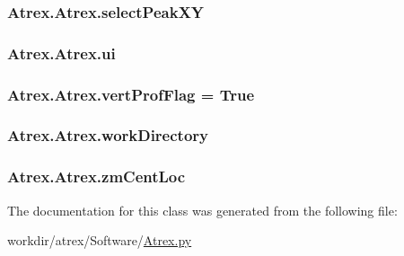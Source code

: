 \hypertarget{class_atrex_1_1_atrex_a9ddce163f1008e4421d95874f8a7e006}{
\subsubsection[{select\-Peak\-X\-Y}]{\setlength{\rightskip}{0pt plus 5cm}Atrex.\-Atrex.\-select\-Peak\-X\-Y}}\label{class_atrex_1_1_atrex_a9ddce163f1008e4421d95874f8a7e006}
\hypertarget{class_atrex_1_1_atrex_a35cabdfa4a6164da07e19c4b4ed957aa}{
\subsubsection[{ui}]{\setlength{\rightskip}{0pt plus 5cm}Atrex.\-Atrex.\-ui}}\label{class_atrex_1_1_atrex_a35cabdfa4a6164da07e19c4b4ed957aa}
\hypertarget{class_atrex_1_1_atrex_a4ca8a779dc0d0c890538d52bf28dd7da}{
\subsubsection[{vert\-Prof\-Flag}]{\setlength{\rightskip}{0pt plus 5cm}Atrex.\-Atrex.\-vert\-Prof\-Flag = True\hspace{0.3cm}{\ttfamily [static]}}}\label{class_atrex_1_1_atrex_a4ca8a779dc0d0c890538d52bf28dd7da}
\hypertarget{class_atrex_1_1_atrex_aba7d9d2058a5bdace86c305ecd35ad3b}{
\subsubsection[{work\-Directory}]{\setlength{\rightskip}{0pt plus 5cm}Atrex.\-Atrex.\-work\-Directory}}\label{class_atrex_1_1_atrex_aba7d9d2058a5bdace86c305ecd35ad3b}
\hypertarget{class_atrex_1_1_atrex_a7f2c3002d88c2f13aa3f0f19899a0ab7}{
\subsubsection[{zm\-Cent\-Loc}]{\setlength{\rightskip}{0pt plus 5cm}Atrex.\-Atrex.\-zm\-Cent\-Loc}}\label{class_atrex_1_1_atrex_a7f2c3002d88c2f13aa3f0f19899a0ab7}


The documentation for this class was generated from the following file\-:\begin{DoxyCompactItemize}
\item 
workdir/atrex/\-Software/\hyperlink{_atrex_8py}{Atrex.\-py}\end{DoxyCompactItemize}
